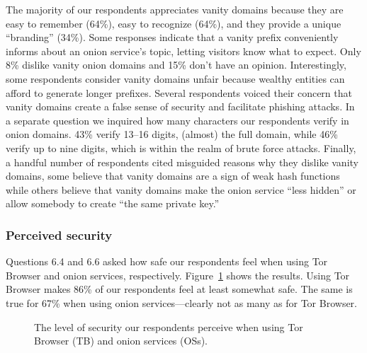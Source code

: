 The majority of our respondents appreciates vanity domains because they are easy
to remember (64\%), easy to recognize (64\%), and they provide a unique
``branding'' (34\%).  Some responses indicate that a vanity prefix conveniently
informs about an onion service's topic, letting visitors know what to expect.
Only 8\% dislike vanity onion domains and 15\% don't have an opinion.
Interestingly, some respondents consider vanity domains unfair because wealthy
entities can afford to generate longer prefixes.  Several respondents voiced
their concern that vanity domains create a false sense of security and
facilitate phishing attacks.  In a separate question we inquired how many
characters our respondents verify in onion domains.  43\% verify 13--16 digits,
\ie (almost) the full domain, while 46\% verify up to nine digits, which is
within the realm of brute force attacks.  Finally, a handful number of
respondents cited misguided reasons why they dislike vanity domains, \eg some
believe that vanity domains are a sign of weak hash functions while others
believe that vanity domains make the onion service ``less hidden'' or allow
somebody to create ``the same private key.''

\subsubsection{Perceived security}

Questions 6.4 and 6.6 asked how safe our respondents feel when using Tor Browser
and onion services, respectively.  Figure~\ref{fig:perceived-security} shows the
results.  Using Tor Browser makes 86\% of our respondents feel at least somewhat
safe.  The same is true for 67\% when using onion services---clearly not as many
as for Tor Browser.

\begin{figure}[t]
    \centering
    
    \caption{The level of security our respondents perceive when using Tor
    Browser (TB) and onion services (OSs).}
    \label{fig:perceived-security}
\end{figure}

